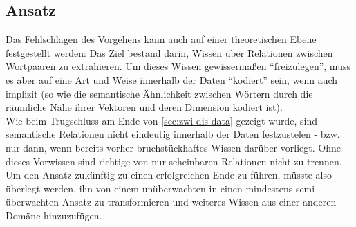 \subsection{Ansatz}

Das Fehlschlagen des Vorgehens kann auch auf einer theoretischen Ebene festgestellt werden: Das Ziel bestand darin, Wissen
über Relationen zwischen Wortpaaren zu extrahieren. Um dieses Wissen gewissermaßen ``freizulegen'', muss es aber auf eine
Art und Weise innerhalb der Daten ``kodiert'' sein, wenn auch implizit (so wie die semantische Ähnlichkeit zwischen Wörtern
durch die räumliche Nähe ihrer Vektoren und deren Dimension kodiert ist).\\
Wie beim Trugschluss am Ende von \ref{sec:zwi-dis-data} gezeigt wurde, sind semantische Relationen nicht eindeutig
innerhalb der Daten festzustelen - bzw. nur dann, wenn bereits vorher bruchstückhaftes Wissen darüber vorliegt. Ohne
dieses Vorwissen sind richtige von nur scheinbaren Relationen nicht zu trennen. Um den Ansatz zukünftig zu einen erfolgreichen
Ende zu führen, müsste also überlegt werden, ihn von einem unüberwachten in einen mindestens semi-überwachten Ansatz zu
transformieren und weiteres Wissen aus einer anderen Domäne hinzuzufügen.
